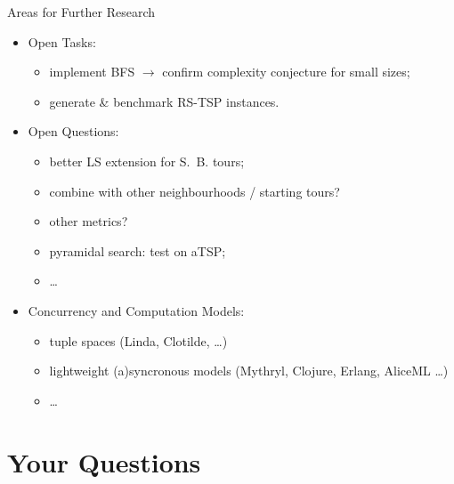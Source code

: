 \documentclass[
  size=8pt,
  style=klope,
  paper=screen,
  pauseslide,
  nopagebreaks,
  hlsections,
  fleqn
]{powerdot}
\begin{document}
\begin{slide}{Areas for Further Research}
{\small

  \begin{itemize}
  \item
  Open Tasks:
    \begin{itemize}
      \item implement BFS $\rightarrow$ confirm complexity conjecture for small sizes;
    \item generate \& benchmark RS-TSP instances.
    \end{itemize}
  \item
  Open Questions:
    \begin{itemize}
    \item better LS extension for S.\ B. tours;
    \item combine with other neighbourhoods / starting tours?
    \item other metrics?
    \item pyramidal search: test on aTSP;
    \item \ldots
    \end{itemize}
  \item
  Concurrency and Computation Models:
    \begin{itemize}
    \item tuple spaces (Linda, Clotilde, \ldots)
    \item lightweight (a)syncronous models (Mythryl, Clojure, Erlang, AliceML \ldots)
    \item \ldots
    \end{itemize}
  \end{itemize}

}
\end{slide}


\section[template=wideslide]{Your Questions}
\end{document}

